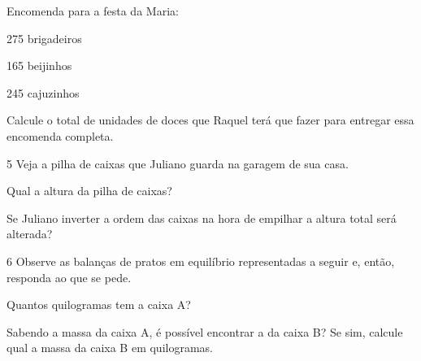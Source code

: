 Encomenda para a festa da Maria:

275 brigadeiros

165 beijinhos

245 cajuzinhos

Calcule o total de unidades de doces que Raquel terá que fazer para entregar essa encomenda completa.



\num{5} Veja a pilha de caixas que Juliano guarda na garagem de sua casa.


\begin{escolha}
\item
  Qual a altura da pilha de caixas?



\item
  Se Juliano inverter a ordem das caixas na hora de empilhar a altura
  total será alterada? \preencher {}
\end{escolha}


\num{6} Observe as balanças de pratos em equilíbrio representadas a seguir e, então, responda ao que se pede.


\begin{escolha}
\item Quantos quilogramas tem a caixa A?



\item Sabendo a massa da caixa A, é possível encontrar a da caixa B? Se sim,
  calcule qual a massa da caixa B em quilogramas.


\end{escolha}

